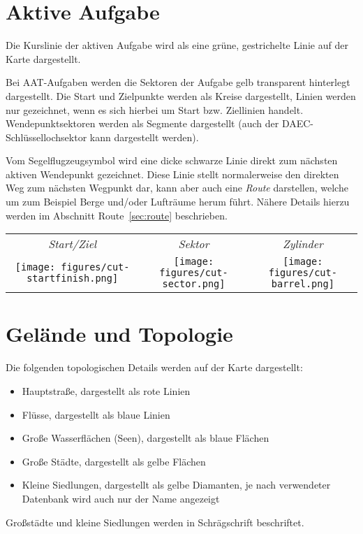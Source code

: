 \section{Aktive Aufgabe}

Die Kurslinie der aktiven Aufgabe wird als eine grüne, gestrichelte Linie auf der Karte dargestellt.

Bei AAT-Aufgaben werden die Sektoren der Aufgabe gelb transparent hinterlegt dargestellt.
Die Start und Zielpunkte werden als Kreise dargestellt, Linien werden nur 
gezeichnet, wenn es sich hierbei um Start bzw. Ziellinien handelt.
Wendepunktsektoren werden als Segmente dargestellt (auch der DAEC-Schlüssellochsektor kann dargestellt werden).


Vom Segelflugzeugsymbol wird eine dicke schwarze Linie direkt zum nächsten aktiven Wendepunkt gezeichnet. Diese Linie stellt normalerweise den direkten Weg zum nächsten Wegpunkt dar, kann aber auch eine {\em Route} darstellen, welche um zum Beispiel Berge und/oder Lufträume herum führt. Nähere Details hierzu werden im Abschnitt Route~\ref{sec:route}  beschrieben.
\begin{center}
\begin{tabular}{c c c}
{\it Start/Ziel} & {\it Sektor} & {\it Zylinder} \\
\texttt{[image: figures/cut-startfinish.png]} &
\texttt{[image: figures/cut-sector.png]} &
\texttt{[image: figures/cut-barrel.png]} \\
\end{tabular}
\end{center}
\section{Gelände und Topologie}

Die folgenden topologischen Details werden auf der Karte dargestellt:
\begin{itemize}
\item Hauptstraße, dargestellt als rote Linien
\item Flüsse, dargestellt als blaue Linien
\item Große Wasserflächen (Seen), dargestellt als blaue Flächen
\item Große Städte, dargestellt als gelbe Flächen
\item Kleine Siedlungen, dargestellt als gelbe Diamanten, je nach verwendeter Datenbank wird auch nur der Name angezeigt 
\end{itemize}
Großstädte und kleine Siedlungen werden in Schrägschrift beschriftet.

